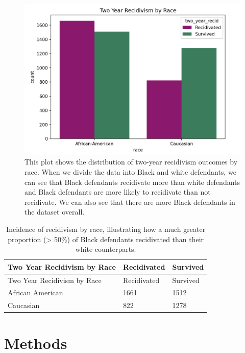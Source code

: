 \documentclass[water,article,submit,moreauthors,pdftex]{mdpi}
\begin{document}
\begin{figure}

{\centering \includegraphics[width=1\linewidth]{../images/race_recid_bar_plot_new} 

}

\caption{This plot shows the distribution of two-year recidivism outcomes by race. When we divide the data into Black and white defendants, we can see that Black defendants recidivate more than white defendants and Black defendants are more likely to recidivate than not recidivate. We can also see that there are more Black defendants in the dataset overall.}\label{fig:recid race plot}
\end{figure}

\begin{longtable}[]{@{}lll@{}}
\caption{Incidence of recidivism by race, illustrating how a much
greater proportion (\textgreater{} 50\%) of Black defendants recidivated
than their white counterparts. \label{tab:recid table}}\tabularnewline
\toprule
Two Year Recidivism by Race & Recidivated & Survived \\
\midrule
\endfirsthead
\toprule
Two Year Recidivism by Race & Recidivated & Survived \\
\midrule
\endhead
African American & 1661 & 1512 \\
Caucasian & 822 & 1278 \\
\bottomrule
\end{longtable}

\hypertarget{methods}{%
\section{Methods}\label{methods}}
\end{document}
